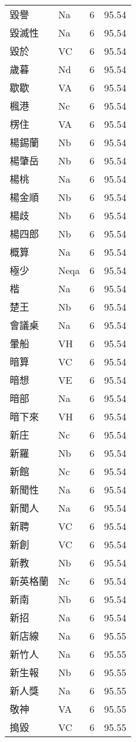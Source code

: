 \documentclass[twocolumn]{book}
\begin{document}
\begin{supertabular}{llrr}
毀譽 & Na & 6 &  95.54\\
毀滅性 & Na & 6 &  95.54\\
毀於 & VC & 6 &  95.54\\
歲暮 & Nd & 6 &  95.54\\
歇歇 & VA & 6 &  95.54\\
楓港 & Nc & 6 &  95.54\\
楞住 & VA & 6 &  95.54\\
楊錫蘭 & Nb & 6 &  95.54\\
楊肇岳 & Nb & 6 &  95.54\\
楊桃 & Na & 6 &  95.54\\
楊金順 & Nb & 6 &  95.54\\
楊歧 & Nb & 6 &  95.54\\
楊四郎 & Nb & 6 &  95.54\\
概算 & Na & 6 &  95.54\\
極少 & Neqa & 6 &  95.54\\
楷 & Na & 6 &  95.54\\
楚王 & Nb & 6 &  95.54\\
會議桌 & Na & 6 &  95.54\\
暈船 & VH & 6 &  95.54\\
暗算 & VC & 6 &  95.54\\
暗想 & VE & 6 &  95.54\\
暗部 & Na & 6 &  95.54\\
暗下來 & VH & 6 &  95.54\\
新庄 & Nc & 6 &  95.54\\
新羅 & Nb & 6 &  95.54\\
新館 & Nc & 6 &  95.54\\
新聞性 & Na & 6 &  95.54\\
新聞人 & Na & 6 &  95.54\\
新聘 & VC & 6 &  95.54\\
新創 & VC & 6 &  95.54\\
新教 & Nb & 6 &  95.54\\
新英格蘭 & Nc & 6 &  95.54\\
新南 & Nb & 6 &  95.54\\
新招 & Na & 6 &  95.54\\
新店線 & Na & 6 &  95.55\\
新竹人 & Na & 6 &  95.55\\
新生報 & Nb & 6 &  95.55\\
新人獎 & Na & 6 &  95.55\\
敬神 & VA & 6 &  95.55\\
搗毀 & VC & 6 &  95.55\\

\end{supertabular}
\end{document}
